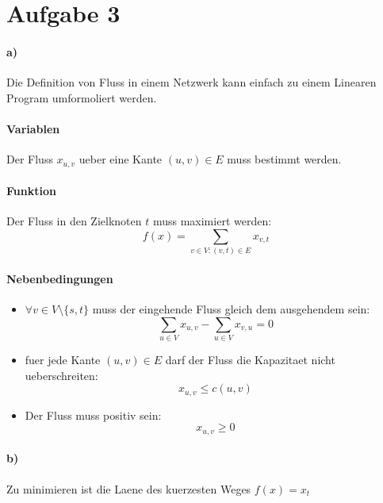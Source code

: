 \section*{Aufgabe 3}
\paragraph{a)}
Die Definition von Fluss in einem Netzwerk kann einfach zu einem Linearen Program umformoliert werden.

\paragraph{Variablen}
Der Fluss $x_{u,v}$ ueber eine Kante $(u,v) \in E$ muss bestimmt werden.

\paragraph{Funktion}
Der Fluss in den Zielknoten $t$ muss maximiert werden:
\begin{equation}
f(x) = \sum_{v\in V: (v,t) \in E} x_{v,t}
\end{equation}

\paragraph{Nebenbedingungen}
\begin{itemize}
\item $\forall v \in V \setminus \{s,t\}$ muss der eingehende Fluss gleich dem ausgehendem sein:
    \begin{equation}
    \sum_{u\in V} x_{u,v} - \sum_{u\in V} x_{v,u} = 0
    \end{equation}
\item fuer jede Kante $(u,v) \in E$ darf der Fluss die Kapazitaet nicht ueberschreiten:
    \begin{equation}
    x_{u,v} \leq c(u,v)
    \end{equation}
\item Der Fluss muss positiv sein:
    \begin{equation}
    x_{u,v} \geq 0
    \end{equation}
\end{itemize}

\paragraph{b)}
Zu minimieren ist die Laene des kuerzesten Weges $f(x) = x_t$

